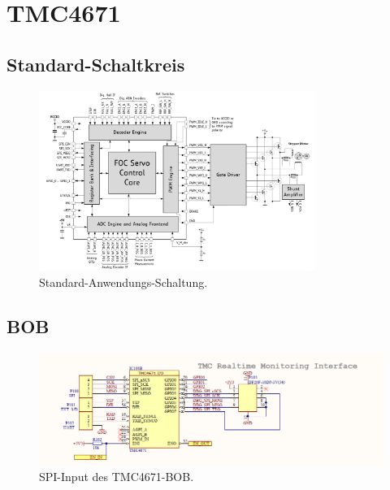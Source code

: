 \section{TMC4671}\label{Appendix:TMC4671}

\subsection{Standard-Schaltkreis}\label{Appendix:Schaltung_TMC4671}

\begin{figure}[H]
	\centering
	\includegraphics[width=0.8\textwidth]{graphics/Standard_Application_Cirquit_TMC4671}
	\caption{Standard-Anwendungs-Schaltung. \cite[S.138]{trinamicmotion_control_gmbh__co_kg_tmc4671_2019}}
	\label{fig:Schaltung_TMC4671}
\end{figure}

\subsection{BOB}\label{Appendix:BOB}

\begin{figure}[H]
	\centering
	\includegraphics[width=\textwidth]{graphics/TMC4671_SPI_BOB_Schematic}
	\caption{SPI-Input des TMC4671-BOB. \cite[S.2]{trinamicmotion_control_gmbh__co_kg_tmc4671-bob_2020}}
	\label{fig:Schema_SPI_FOC_Treiber}
\end{figure} 

